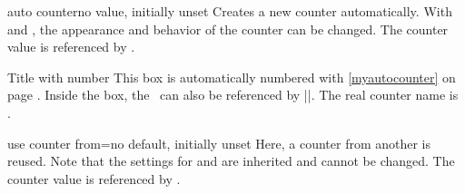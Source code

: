 \begin{newTcbKey}{auto counter}{}{no value, initially unset}
Creates a new counter automatically.
With  and
, the appearance and behavior of the counter
can be changed. The counter value is referenced by .


\begin{dispExample}
\begin{pabox}[label={myautocounter}]{Title with number}
This box is automatically numbered with \ref{myautocounter} on page
\pageref{myautocounter}. Inside the box, the \thetcbcounter\ can
also be referenced by |\thetcbcounter|.
The real counter name is \texttt{\tcbcounter}.
\end{pabox}
\end{dispExample}
\end{newTcbKey}

\clearpage
\begin{newTcbKey}{use counter from}{=}{no default, initially unset}
Here, a counter from another  is reused.
Note that the settings for  and
 are inherited and cannot be changed.
The counter value is referenced by .

\end{newTcbKey}


